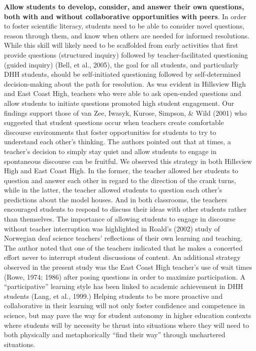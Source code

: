 \documentclass[11.5pt]{sig-alternate} %
\begin{document}
\begin{large}
\textbf{Allow students to develop, consider, and answer their own questions, both with and without collaborative opportunities with peers}. In order to foster scientific literacy, students need to be able to consider novel questions, reason through them, and know when others are needed for informed resolutions.  While this skill will likely need to be scaffolded from early activities that first provide questions (structured inquiry) followed by teacher-facilitated questioning (guided inquiry) (Bell, et al., 2005), the goal for all students, and particularly DHH students, should be self-initiated questioning followed by self-determined decision-making about the path for resolution. As was evident in Hillsview High and East Coast High, teachers who were able to ask open-ended questions and allow students to initiate questions promoted high student engagement. Our findings support those of van Zee, Iwasyk, Kurose, Simpson, \& Wild (2001) who suggested that student questions occur when teachers create comfortable discourse environments that foster opportunities for students to try to understand each other’s thinking.  The authors pointed out that at times, a teacher’s decision to simply stay quiet and allow students to engage in spontaneous discourse can be fruitful.  We observed this strategy in both Hillsview High and East Coast High.  In the former, the teacher allowed her students to question and answer each other in regard to the direction of the crank turns, while in the latter, the teacher allowed students to question each other’s predictions about the model houses.  And in both classrooms, the teachers encouraged students to respond to discuss their ideas with other students rather than themselves.  The importance of allowing students to engage in discourse without teacher interruption was highlighted in Roald’s (2002) study of Norwegian deaf science teachers’ reflections of their own learning and teaching.  The author noted that one of the teachers indicated that he makes a concerted effort never to interrupt student discussions of content.  An additional strategy observed in the present study was the East Coast High teacher’s use of wait times (Rowe, 1974; 1986) after posing questions in order to maximize participation.  A “participative” learning style has been linked to academic achievement in DHH students (Lang, et al., 1999.) Helping students to be more proactive and collaborative in their learning will not only foster confidence and competence in science, but may pave the way for student autonomy in higher education contexts where students will by necessity be thrust into situations where they will need to both physically and metaphorically “find their way” through unchartered situations.  


\end{large}
\end{document}
